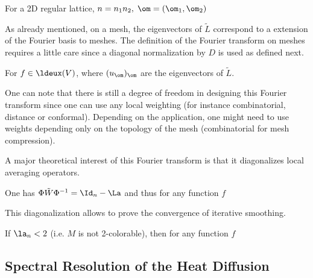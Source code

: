 \begin{thm}[Spectrum in 2D] For a 2D regular lattice, $n=n_1n_2, \; \om = (\om_1,\om_2)$
\end{thm}


As already mentioned, on a mesh, the eigenvectors of $\tilde L$ correspond to a extension of the Fourier basis to meshes. The definition of the Fourier transform on meshes requires a little care since a diagonal normalization by $D$ is used as defined next.

\begin{defn} For $f \in \ldeux(V)$, 
where  $(u_\om)_{\om}$ are the eigenvectors of $\tilde L$.
\end{defn}

One can note that there is still a degree of freedom in designing this Fourier transform since one can use any local weighting (for instance combinatorial, distance or conformal). Depending on the application, one might need to use weights depending only on the topology of the mesh (combinatorial for mesh compression). 

A major theoretical interest of this Fourier transform is that it diagonalizes local averaging operators.

\begin{thm} One has $\Phi \tilde W \Phi^{-1} = \Id_n-\La$ and thus for any function $f$
\end{thm}

This diagonalization allows to prove the convergence of iterative smoothing.

\begin{thm} If $\la_n<2$ (i.e. $M$ is not 2-colorable), then for any function $f$
\end{thm}



\subsection{Spectral Resolution of the Heat Diffusion}

